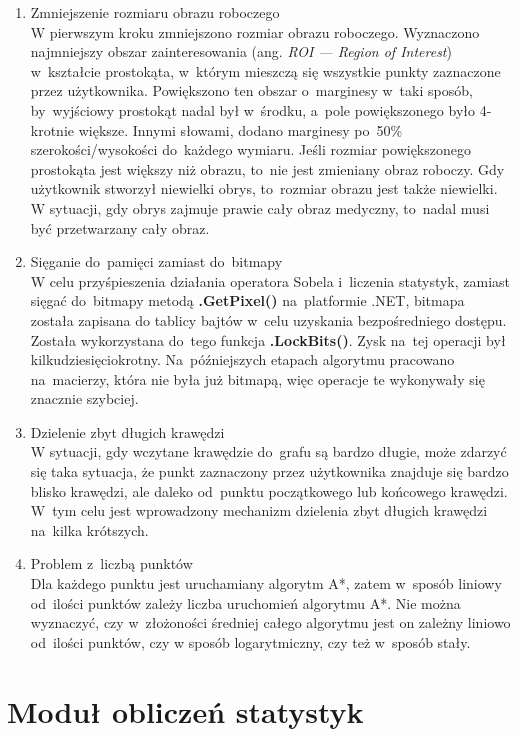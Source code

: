 \documentclass[a4paper,11pt,twoside,openright]{report}
\theoremstyle{definition}
\begin{document}
\begin{enumerate}
\item Zmniejszenie rozmiaru obrazu roboczego \\
W pierwszym kroku zmniejszono rozmiar obrazu roboczego. Wyznaczono najmniejszy obszar
zainteresowania (ang. \textit{ROI --- Region of Interest}) w~kształcie
prostokąta, w~którym mieszczą się wszystkie punkty zaznaczone przez użytkownika.
Powiększono ten obszar o~marginesy w~taki sposób, by~wyjściowy prostokąt nadal
był w~środku, a~pole powiększonego było 4-krotnie większe. Innymi słowami,
dodano marginesy po~50\% szerokości/wysokości do~każdego wymiaru. Jeśli rozmiar
powiększonego prostokąta jest większy niż obrazu, to~nie jest zmieniany obraz roboczy.
Gdy użytkownik stworzył niewielki obrys, to~rozmiar obrazu jest także niewielki.
W sytuacji, gdy obrys zajmuje prawie cały obraz medyczny, to~nadal musi być
przetwarzany cały obraz.
\item Sięganie do~pamięci zamiast do~bitmapy \\
W celu przyśpieszenia działania operatora Sobela i~liczenia statystyk, zamiast
sięgać do~bitmapy metodą \textbf{.GetPixel()} na~platformie .NET, bitmapa została zapisana
do tablicy bajtów w~celu uzyskania bezpośredniego dostępu. Została wykorzystana do~tego
funkcja \textbf{.LockBits()}. Zysk na~tej operacji był kilkudziesięciokrotny. Na~późniejszych
etapach algorytmu pracowano na~macierzy, która nie była już bitmapą, więc operacje
te wykonywały się znacznie szybciej.
\item Dzielenie zbyt długich krawędzi \\
W sytuacji, gdy wczytane krawędzie do~grafu są bardzo długie, może zdarzyć się
taka sytuacja, że punkt zaznaczony przez użytkownika znajduje się bardzo blisko
krawędzi, ale daleko od~punktu początkowego lub końcowego krawędzi. W~tym celu
jest wprowadzony mechanizm dzielenia zbyt długich krawędzi na~kilka krótszych. \\
\item Problem z~liczbą punktów \\
Dla każdego punktu jest uruchamiany algorytm A*, zatem w~sposób liniowy od~ilości
punktów zależy liczba uruchomień algorytmu A*. Nie można wyznaczyć, czy w~złożoności
średniej całego algorytmu jest on zależny liniowo od~ilości punktów, czy
w sposób logarytmiczny, czy też w~sposób stały.
\end{enumerate}

\section {Moduł obliczeń statystyk}
\end{document}
